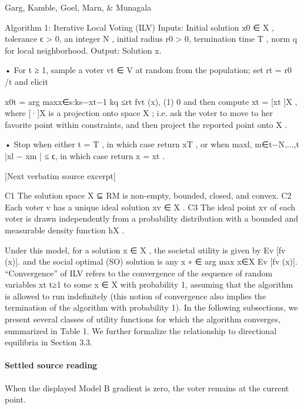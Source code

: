 \documentclass[10pt]{article}
\begin{document}
\begin{ReviewVerbatim}
                          Garg, Kamble, Goel, Marn, & Munagala


 Algorithm 1: Iterative Local Voting (ILV)
  Inputs: Initial solution x0 ∈ X , tolerance ϵ > 0, an integer N , initial radius r0 > 0,
    termination time T , norm q for local neighborhood.
   Output:     Solution x.

       • For t ≥ 1, sample a voter vt ∈ V at random from the population; set rt = r0 /t
           and elicit


                             x0t = arg maxx∈{s:ks−xt−1 kq ≤rt } fvt (x),             (1)
                                         0
           and then compute xt = [xt ]X , where [·]X is a projection onto space X ; i.e. ask
           the voter to move to her favorite point within constraints, and then project the
           reported point onto X .


       • Stop when either t = T , in which case return xT , or when
         maxl, m∈{t−N,...,t} |xl − xm | ≤ ϵ, in which case return x = xt .

[Next verbatim source excerpt]

 C1 The solution space X ⊆ RM is non-empty, bounded, closed, and convex.
 C2 Each voter v has a unique ideal solution xv ∈ X .
 C3 The ideal point xv of each voter is drawn independently from a probability distribution
      with a bounded and measurable density function hX .


Under this model, for a solution x ∈ X , the societal utility is given by Ev [fv (x)]. and the
social optimal (SO) solution is any x
                                         ∗ ∈ arg max
                                                    x∈X Ev [fv (x)].
   “Convergence” of    ILV refers to the convergence of the sequence of random variables
{xt }t≥1 to some x ∈ X with probability 1, assuming that the algorithm is allowed to run
indefinitely (this notion of convergence also implies the termination of the algorithm with
probability 1).
   In the following subsections, we present several classes of utility functions for which
the algorithm converges, summarized in Table 1. We further formalize the relationship to
directional equilibria in Section 3.3.
\end{ReviewVerbatim}

\paragraph{Settled source reading}
\begin{sloppypar}
When the displayed Model B gradient is zero, the voter remains at the current point.\allowbreak{}
\end{sloppypar}
\end{document}

